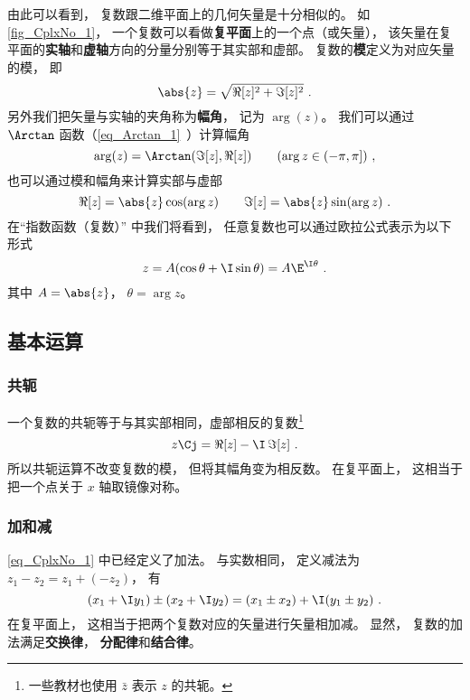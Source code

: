 由此可以看到， 复数跟二维平面上的几何矢量是十分相似的。 如\autoref{fig_CplxNo_1}， 一个复数可以看做\textbf{复平面}上的一个点（或矢量）， 该矢量在复平面的\textbf{实轴}和\textbf{虚轴}方向的分量分别等于其实部和虚部。 复数的\textbf{模}定义为对应矢量的模， 即
\begin{equation}
\abs{z} = \sqrt{\Re[z]^2 + \Im[z]^2}~.
\end{equation}
另外我们把矢量与实轴的夹角称为\textbf{幅角}， 记为 $\arg(z)$。 我们可以通过 $\Arctan$ 函数（\autoref{eq_Arctan_1}~）计算幅角
\begin{equation}\label{eq_CplxNo_5}
\arg(z) = \Arctan(\Im[z], \Re[z])
\qquad (\arg z \in (-\pi, \pi])~,
\end{equation}
也可以通过模和幅角来计算实部与虚部
\begin{equation}
\Re[z] = \abs{z}\cos(\arg z) \qquad \Im[z] = \abs{z}\sin(\arg z)~.
\end{equation}
在“指数函数（复数）” 中我们将看到， 任意复数也可以通过欧拉公式表示为以下形式
\begin{equation}
z = A(\cos\theta + \I\sin\theta) = A\E^{\I\theta}~.
\end{equation}
其中 $A = \abs{z}$， $\theta = \arg z$。

\subsection{基本运算}
\subsubsection{共轭}
一个复数的共轭等于与其实部相同，虚部相反的复数\footnote{一些教材也使用 $\bar z$ 表示 $z$ 的共轭。}
\begin{equation}\label{eq_CplxNo_6}
z\Cj = \Re[z] - \I\, \Im[z]~.
\end{equation}
所以共轭运算不改变复数的模， 但将其幅角变为相反数。 在复平面上， 这相当于把一个点关于 $x$ 轴取镜像对称。

\subsubsection{加和减}
\autoref{eq_CplxNo_1} 中已经定义了加法。 与实数相同， 定义减法为 $z_1 - z_2 = z_1 + (-z_2)$， 有
\begin{equation}
(x_1 + \I y_1) \pm (x_2 + \I y_2) = (x_1 \pm x_2) + \I (y_1 \pm y_2)~.
\end{equation}
在复平面上， 这相当于把两个复数对应的矢量进行矢量相加减。 显然， 复数的加法满足\textbf{交换律}， \textbf{分配律}和\textbf{结合律}。

